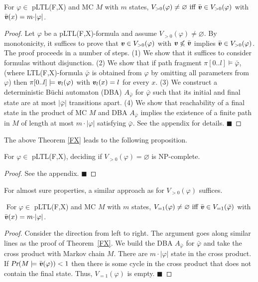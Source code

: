 \documentclass{llncs}
\renewcommand{\Pr}{\mbox{\rm Pr}}
\renewcommand{\Pr}{\mbox{\sl Pr}}
\renewcommand{\leq}{\leqslant}
\renewcommand{\emptyset}{\varnothing}
\renewcommand{\a}[1]{\textbf{\textit{#1}}}
\newcommand{\ve}{{{\a v}}}
\begin{document}
\begin{theorem}\label{FX}
For $\varphi \in$ pLTL(F,X) and MC $M$ with $m$ states, 
$V_{{>} 0}(\varphi) \neq \emptyset \mbox{ iff } \bar{{\a v}} \in V_{{>} 0}(\varphi)$ with $\bar{{\a v}}(x) = m{\cdot}|\varphi|$.
\end{theorem}
\begin{proof} 
Let $\varphi$ be a pLTL(F,X)-formula and assume $V_{> 0}(\varphi) \neq \emptyset$.
By monotonicity, it suffices to prove that ${\a v}\in V_{>0}(\varphi)$ with ${\a v} \not\leq \bar{{\a v}}$ implies $\bar{{\a v}} \in V_{>0}(\varphi)$.
The proof proceeds in a number of steps. 
(1) We show that it suffices to consider formulas without disjunction. 
(2) We show that if path fragment
$\pi[0..l] \models \bar\varphi$, (where LTL(F,X)-formula $\bar\varphi$ is obtained from $\varphi$ by omitting all parameters from $\varphi$) 
then $\pi[0..l] \models {\a v}_l(\varphi)$  with ${\a v}_l(x) = l$ for every $x$.
(3) We construct a deterministic B\"uchi automaton (DBA) $A_{\bar\varphi}$ for $\bar\varphi$ such that its initial and final state are at most $| \bar\varphi |$ transitions apart.
(4) We show that reachability of a final state in the product of MC $M$ and DBA $A_{\bar\varphi}$ implies the existence of a finite path in $M$  
of length at most $m{\cdot}|\varphi|$ satisfying $\bar\varphi$.
See the appendix for details. \hfill $\blacksquare$
\end{proof}
 The above Theorem \ref{FX} leads to the following proposition.
\begin{proposition}\label{np}
For $\varphi \in$ pLTL(F,X), deciding if $V_{>0}(\varphi)=\emptyset$  is NP-complete. 
\end{proposition}
\begin{proof}
 See the appendix.  
 \hfill $\blacksquare$
\end{proof}

\noindent
For almost sure properties, a similar approach as for $V_{>0}(\varphi)$ suffices.
\begin{theorem}
$\!\!\!\!$ For $\varphi \in$ pLTL(F,X) and MC $M$ with $m$ states,
$V_{{=} 1}(\varphi) \neq \emptyset \mbox{ iff } \bar{ {\a v}} \in V_{{=} 1}(\bar\varphi)$ 
with $\bar{ {\a v}}(x) = m{\cdot}|\varphi|$.
\end{theorem}
\begin{proof}
 Consider the direction from left to right.
The argument goes along similar lines as the proof of Theorem~\ref{FX}. We build the DBA $A_{\bar\varphi}$ for $\bar\varphi$ and take the cross product with Markov chain $M$. There
are $m{\cdot}|\varphi|$ state in the cross product. If $\Pr(M\models {\bar{\ve}}(\varphi))<1$ then there is some cycle in the cross product that
does not contain the final state. Thus, $V_{=1}(\varphi)$ is empty. \hfill $\blacksquare$
\end{proof}
\end{document}
